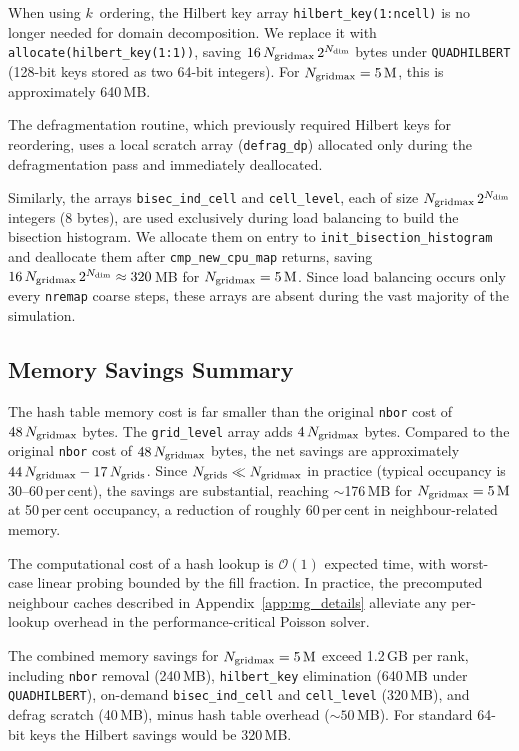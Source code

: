 \documentclass[fleqn,usenatbib]{mnras}
\newcommand{\ngridmax}{N_{\rm gridmax}}
\newcommand{\twotondim}{2^{N_{\rm dim}}}
\newcommand{\ksec}{\ensuremath{k}\text{-section}}
\newcommand{\Olog}[1]{\mathcal{O}(#1)}
\newcommand{\code}[1]{\texttt{#1}}
\begin{document}
When using \ksec\ ordering, the Hilbert key array
\code{hilbert\_key(1:ncell)} is no longer needed for domain
decomposition. We replace it with \code{allocate(hilbert\_key(1:1))},
saving $16\,\ngridmax\,\twotondim$ bytes
under \code{QUADHILBERT} (128-bit keys stored as two 64-bit integers).
For $\ngridmax = 5\,\mathrm{M}$, this is approximately 640\,MB.

The defragmentation routine, which previously required Hilbert keys
for reordering, uses a local scratch array (\code{defrag\_dp})
allocated only during the defragmentation pass and immediately
deallocated.

Similarly, the arrays \code{bisec\_ind\_cell} and \code{cell\_level},
each of size $\ngridmax\,\twotondim$ integers (8 bytes), are used
exclusively during load balancing to build the bisection histogram.
We allocate them on entry to \code{init\_bisection\_histogram} and
deallocate them after \code{cmp\_new\_cpu\_map} returns, saving
$16\,\ngridmax\,\twotondim \approx 320$\,MB
for $\ngridmax = 5\,\mathrm{M}$. Since load balancing occurs only
every \code{nremap} coarse steps, these arrays are absent during the
vast majority of the simulation.


\subsection{Memory Savings Summary}
\label{app:mem_summary}

The hash table memory cost is
far smaller than the original \code{nbor} cost of $48\,\ngridmax$ bytes.
The \code{grid\_level} array adds $4\,\ngridmax$ bytes.
Compared to the original \code{nbor} cost of $48\,\ngridmax$
bytes, the net savings are approximately
$44\,\ngridmax - 17\,N_{\rm grids}$.
Since $N_{\rm grids} \ll \ngridmax$ in practice (typical occupancy is
30--60\,per\,cent), the savings are substantial, reaching $\sim$176\,MB for
$\ngridmax = 5\,\mathrm{M}$ at 50\,per\,cent occupancy,
a reduction of roughly 60\,per\,cent in neighbour-related memory.

The computational cost of a hash lookup is $\Olog{1}$ expected time,
with worst-case linear probing bounded by the fill fraction. In
practice, the precomputed neighbour caches described in
Appendix~\ref{app:mg_details} alleviate any per-lookup overhead in the
performance-critical Poisson solver.

The combined memory savings for $\ngridmax = 5\,\mathrm{M}$ exceed
1.2\,GB per rank, including \code{nbor} removal (240\,MB),
\code{hilbert\_key} elimination (640\,MB under \code{QUADHILBERT}),
on-demand \code{bisec\_ind\_cell} and \code{cell\_level} (320\,MB),
and defrag scratch (40\,MB), minus hash table overhead
(${\sim}50$\,MB). For standard 64-bit keys the Hilbert savings would be
320\,MB.
\end{document}
